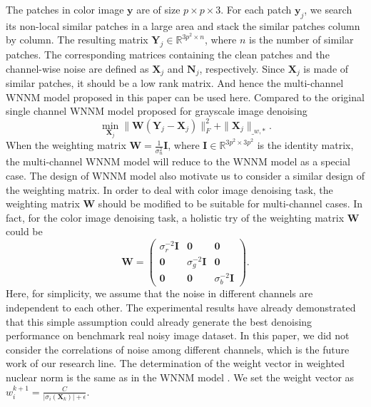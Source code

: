 \documentclass[10pt,twocolumn,letterpaper]{article}
\begin{document}
The patches in color image $\mathbf{y}$  are of size $p\times p\times 3$. For each patch $\mathbf{y}_{j}$, we search its non-local similar patches in a large area and stack the similar patches column by column. The resulting matrix $\mathbf{Y}_{j}\in\mathbb{R}^{3p^{2}\times n}$, where $n$ is the number of similar patches. The corresponding matrices containing the clean patches and the channel-wise noise are defined as $\mathbf{X}_{j}$ and $\mathbf{N}_{j}$, respectively. Since $\mathbf{X}_{j}$ is made of similar patches, it should be a low rank matrix. And hence the multi-channel WNNM model proposed in this paper can be used here. Compared to the original single channel WNNM model \cite{wnnm} proposed for grayscale image denoising
\begin{equation}
\min_{\mathbf{X}_{j}}
\|
\mathbf{W}
(\mathbf{Y}_{j}
-
\mathbf{X}_{j})
\|_{F}^{2}
+
\|
\mathbf{X}_{j}\|_{\bm_{w},*}.
\end{equation}
When the weighting matrix $\mathbf{W}=\frac{1}{\sigma_{n}^{2}}\mathbf{I}
$, where $\mathbf{I}
\in\mathbb{R}^{3p^{2}\times 3p^{2}}$ is the identity matrix, the multi-channel WNNM model will reduce to the WNNM model as a special case. The design of WNNM model also motivate us to consider a similar design of the weighting matrix. In order to deal with color image denoising task, 
the weighting matrix $\mathbf{W}$ should be modified to be suitable for multi-channel cases. In fact, for the color image denoising task, a holistic try of the weighting matrix $\mathbf{W}$ could be 
\begin{equation}
\mathbf{W}
=
\left( \begin{array}{ccc}
\sigma_{r}^{-2}\mathbf{I} & \mathbf{0} & \mathbf{0}
\\
\mathbf{0} & \sigma_{g}^{-2}\mathbf{I} & \mathbf{0}
\\
\mathbf{0} & \mathbf{0} & \sigma_{b}^{-2}\mathbf{I}
\end{array} \right).
\end{equation}
Here, for simplicity, we assume that the noise in different channels are independent to each other. The experimental results have already demonstrated that this simple assumption could already generate the best denoising performance on benchmark real noisy image dataset. In this paper, we did not consider the correlations of noise among different channels, which is the future work of our research line. The determination of the weight vector in weighted nuclear norm is the same as in the WNNM model \cite{wnnmijcv}. We set the weight vector as $w_{i}^{k+1}=\frac{C}{|\sigma_{i}(\mathbf{X}_{k})|+\epsilon }$. 
\end{document}
